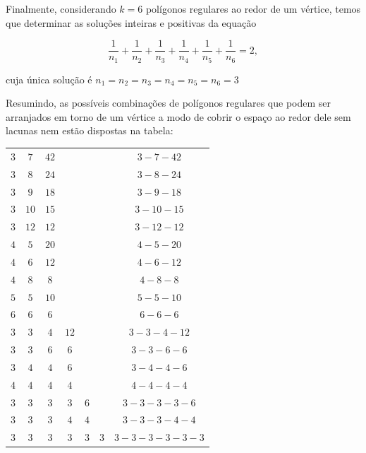 Finalmente, considerando $k=6$ polígonos regulares ao redor de um vértice, temos que determinar as soluções inteiras e positivas da equação

\begin{equation*}
\frac{1}{n_1}+\frac{1}{n_2}+\frac{1}{n_3}+\frac{1}{n_4}+\frac{1}{n_5}+\frac{1}{n_6}=2,
\end{equation*}

cuja única solução é $n_1=n_2=n_3=n_4=n_5=n_6=3$

Resumindo, as possíveis combinações de polígonos regulares que podem ser arranjados em torno de um vértice a modo de cobrir o espaço ao redor dele sem lacunas nem estão dispostas na tabela:

\setlength\tabcolsep{5mm}
\begin{longtabu} to \textwidth{|c|c|c|c|c|c|c|}
\hline\endfirsthead
{} &  &  & &  &  &  \\
\hline
$3$ & $7$ & $42$ & & & & $3-7-42$ \\
\hline
$3$ & $8$ & $24$ & & & & $3-8-24$ \\
\hline
$3$ & $9$ & $18$ & & & & $3-9-18$ \\
\hline
$3$ & $10$ & $15$ & & & & $ 3-10-15$ \\
\hline
$3$ & $12$ & $12$ & & & & $3-12-12$ \\
\hline
$4$ & $5$ & $20$ & & & & $4-5-20$ \\
\hline
$4$ & $6$ & $12$ & & & & $4-6-12$ \\
\hline
$4$ & $8$ & $8$ & & & & $4-8-8$ \\
\hline
$5$ & $5$ & $10$ & & & & $5-5-10$ \\
\hline
$6$ & $6$ & $6$ & & & & $6-6-6$ \\
\hline
$3$ & $3$ & $4$ & $12$ & & & $3-3-4-12$ \\
\hline
$3$ & $3$ & $6$ & $6$ & & & $3-3-6-6$ \\
\hline
$3$ & $4$ & $4$ & $6$ & & & $3-4-4-6$ \\
\hline
$4$ & $4$ & $4$ & $4$ & & & $4-4-4-4$ \\
\hline
$3$ & $3$ & $3$ & $3$ & $6$ & & $3-3-3-3-6$ \\
\hline
$3$ & $3$ & $3$ & $4$ & $4$ & & $3-3-3-4-4$ \\
\hline
$3$ & $3$ & $3$ & $3$ & $3$ & $3$ & $3-3-3-3-3-3$ \\
\hline
\end{longtabu}

